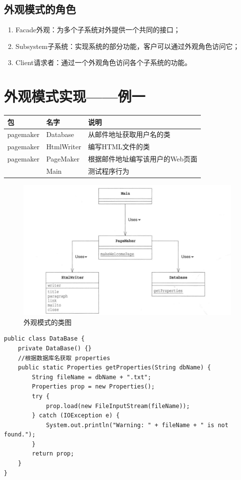 \subsection{外观模式的角色}
\begin{enumerate}
	\item Facade外观：为多个子系统对外提供一个共同的接口；
	\item Subsystem子系统：实现系统的部分功能，客户可以通过外观角色访问它；
	\item Client请求者：通过一个外观角色访问各个子系统的功能。
\end{enumerate}
\section{外观模式实现——例一}
\begin{table}[!h]
	\begin{tabular}{|l|l|l|}
		\hline
		包&名字&说明\\
		\hline
		pagemaker&Database&从邮件地址获取用户名的类\\
		\hline
		pagemaker&HtmlWriter&编写HTML文件的类\\
		\hline
		pagemaker&PageMaker&根据邮件地址编写该用户的Web页面\\
		\hline
		&Main&测试程序行为\\
		\hline
	\end{tabular}
\end{table}
\begin{figure}[!h]
	\centering
	\includegraphics[width=\textwidth]{image/15-3}
	\caption{外观模式的类图}
\end{figure}
\begin{lstlisting}
public class DataBase {
	private DataBase() {}
	//根据数据库名获取 properties
	public static Properties getProperties(String dbName) {
		String fileName = dbName + ".txt";
		Properties prop = new Properties();
		try {
			prop.load(new FileInputStream(fileName));
		} catch (IOException e) {
			System.out.println("Warning: " + fileName + " is not found.");
		}
		return prop;
	}
}
\end{lstlisting}
